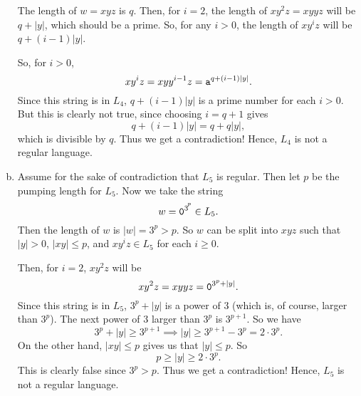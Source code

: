 \documentclass{article}
\begin{document}
\begin{enumerate}[(a)]
The length of \(w = xyz\) is \(q\). Then, for \(i=2\), the length of \(xy^2z = xyyz\) will be \(q + |y|\), which should be a prime. So, for any \(i>0\), the length of \(xy^iz\)  will be \(q + (i-1) |y|\).\

So, for \(i > 0\), 
\[ xy^iz = xy y^{i-1} z = \texttt{a}^{q + (i-1) |y|} .\]
Since this string is in \(L_4\), \(q + (i-1) |y|\) is a prime number for each \(i > 0\). But this is clearly not true, since choosing \(i=q+1\) gives 
\[ q + (i-1) |y| = q + q |y| , \]
which is divisible by \(q\).
Thus we get a contradiction! Hence, \(L_4\) is not a regular language.
\item Assume for the sake of contradiction that \(L_5\) is regular. Then let \(p\) be the pumping length for \(L_5\). Now we take the string 
\[ w = {{\texttt{0}}^3}^{\!^{p}}\in L_5. \]
Then the length of \(w\) is \(|w| = 3^p > p\). So \(w\) can be split into \(xyz\) such that \(|y| > 0\), \(|xy| \leq p\), and \(xy^iz \in L_5\) for each \(i \geq 0\). 

Then, for \(i=2\), \(xy^2z\) will be 
\[ xy^2z = xyyz = \texttt{0} ^{3^p + |y|}  .  \]
Since this string is in \(L_5\), \(3^p + |y|\) is a power of \(3\) (which is, of course, larger than \(3^p\)). The next power of \(3\) larger than \(3^p\) is \(3^{p+1}\). So we have 
\[3^p + |y| \ge 3^{p+1} \implies |y| \ge 3^{p+1} - 3^p = 2 \cdot 3^p . \]
On the other hand, \(|xy|\le p\) gives us that \(|y| \le p\). So 
\[ p \ge |y| \ge 2 \cdot 3^p .  \]
This is clearly false since \(3^p > p\). Thus we get a contradiction! Hence, \(L_5\) is not a regular language.
\end{enumerate}
\end{document}
